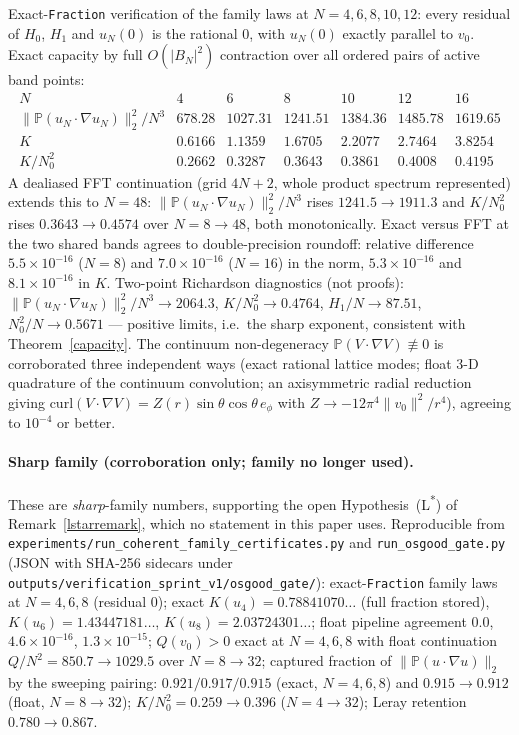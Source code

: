 \documentclass[11pt]{article}
\theoremstyle{definition}
\newcommand{\PP}{\mathbb P}
\begin{document}
Exact-\texttt{Fraction} verification of the family laws at
$N=4,6,8,10,12$: every residual of $H_0$, $H_1$ and $u_N(0)$ is the
rational $0$, with $u_N(0)$ exactly parallel to $v_0$. Exact capacity by
full $O(|B_N|^2)$ contraction over all ordered pairs of active band
points:
\[
\begin{array}{r|rrrrrr}
N & 4 & 6 & 8 & 10 & 12 & 16\\\hline
\|\PP(u_N\!\cdot\!\nabla u_N)\|_2^2/N^3
 & 678.28 & 1027.31 & 1241.51 & 1384.36 & 1485.78 & 1619.65\\
K & 0.6166 & 1.1359 & 1.6705 & 2.2077 & 2.7464 & 3.8254\\
K/N_0^2 & 0.2662 & 0.3287 & 0.3643 & 0.3861 & 0.4008 & 0.4195
\end{array}
\]
A dealiased FFT continuation (grid $4N+2$, whole product spectrum
represented) extends this to $N=48$:
$\|\PP(u_N\cdot\nabla u_N)\|_2^2/N^3$ rises $1241.5\to1911.3$ and
$K/N_0^2$ rises $0.3643\to0.4574$ over $N=8\to48$, both monotonically.
Exact versus FFT at the two shared bands agrees to double-precision
roundoff: relative difference $5.5\times10^{-16}$ ($N=8$) and
$7.0\times10^{-16}$ ($N=16$) in the norm, $5.3\times10^{-16}$ and
$8.1\times10^{-16}$ in $K$. Two-point Richardson diagnostics (not
proofs): $\|\PP(u_N\cdot\nabla u_N)\|_2^2/N^3\to2064.3$,
$K/N_0^2\to0.4764$, $H_1/N\to87.51$, $N_0^2/N\to0.5671$ --- positive
limits, i.e.\ the sharp exponent, consistent with
Theorem~\ref{capacity}. The continuum non-degeneracy
$\PP(V\cdot\nabla V)\not\equiv0$ is corroborated three independent ways
(exact rational lattice modes; float 3-D quadrature of the continuum
convolution; an axisymmetric radial reduction giving
$\mathrm{curl}(V\cdot\nabla V)=Z(r)\sin\theta\cos\theta\,e_\phi$ with
$Z\to-12\pi^4\|v_0\|^2/r^4$), agreeing to $10^{-4}$ or better.

\paragraph{Sharp family (corroboration only; family no longer used).}
These are \emph{sharp}-family numbers, supporting the open
Hypothesis~(L\textsuperscript{*}) of Remark~\ref{lstarremark}, which no
statement in this paper uses. Reproducible from
\texttt{experiments/run\_coherent\_family\_certificates.py} and
\texttt{run\_osgood\_gate.py} (JSON with SHA-256 sidecars under
\texttt{outputs/verification\_sprint\_v1/osgood\_gate/}):
exact-\texttt{Fraction} family laws at $N=4,6,8$ (residual $0$); exact
$K(u_4)=0.78841070\ldots$ (full fraction stored),
$K(u_6)=1.43447181\ldots$, $K(u_8)=2.03724301\ldots$; float pipeline
agreement $0.0$, $4.6\times10^{-16}$, $1.3\times10^{-15}$;
$Q(v_0)>0$ exact at $N=4,6,8$ with float continuation
$Q/N^2=850.7\to1029.5$ over $N=8\to32$; captured fraction of
$\|\PP(u\cdot\nabla u)\|_2$ by the sweeping pairing:
$0.921/0.917/0.915$ (exact, $N=4,6,8$) and
$0.915\to0.912$ (float, $N=8\to32$); $K/N_0^2=0.259\to0.396$
($N=4\to32$); Leray retention $0.780\to0.867$.


\end{document}

